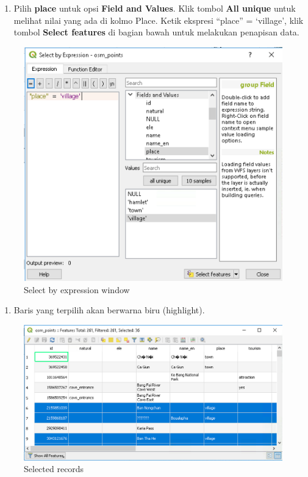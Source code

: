 \documentclass[]{book}
\providecommand{\tightlist}{%
  \setlength{\itemsep}{0pt}\setlength{\parskip}{0pt}}
\begin{document}
\begin{enumerate}
\def\labelenumi{\arabic{enumi}.}
\setcounter{enumi}{3}
\tightlist
\item
  Pilih \textbf{place} untuk opsi \textbf{Field and Values}. Klik tombol \textbf{All unique} untuk melihat nilai yang ada di kolmo Place. Ketik ekspresi ``place'' = `village', klik tombol \textbf{Select features} di bagian bawah untuk melakukan penapisan data.
\end{enumerate}

\begin{figure}

{\centering \includegraphics[width=0.7\linewidth]{images/04/fig26} 

}

\caption{Select by expression window}\label{fig:fig1426}
\end{figure}

\begin{enumerate}
\def\labelenumi{\arabic{enumi}.}
\setcounter{enumi}{4}
\tightlist
\item
  Baris yang terpilih akan berwarna biru (highlight).
\end{enumerate}

\begin{figure}

{\centering \includegraphics[width=0.7\linewidth]{images/04/fig27} 

}

\caption{Selected records}\label{fig:fig1427}
\end{figure}
\end{document}
